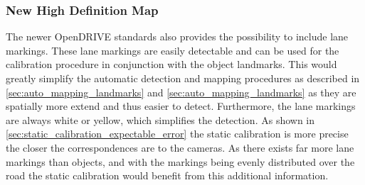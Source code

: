 \subsubsection{New High Definition Map}
The newer OpenDRIVE standards also provides the possibility to include lane markings.
These lane markings are easily detectable and can be used for the calibration procedure in conjunction with the object landmarks.
This would greatly simplify the automatic detection and mapping procedures as described in \autoref{sec:auto_mapping_landmarks} and \autoref{sec:auto_mapping_landmarks} as they are spatially more extend and thus easier to detect.
Furthermore, the lane markings are always white or yellow, which simplifies the detection.
As shown in \autoref{sec:static_calibration_expectable_error} the static calibration is more precise the closer the correspondences are to the cameras. 
As there exists far more lane markings than objects, and with the markings being evenly distributed over the road the static calibration would benefit from this additional information.